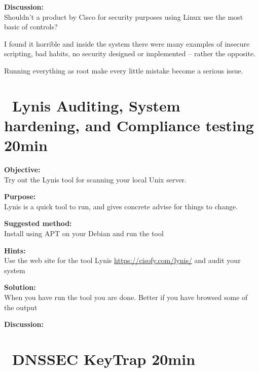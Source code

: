 \documentclass[a4paper,11pt,notitlepage]{report}
\begin{document}
{\bf Discussion:}\\
Shouldn't a product by Cisco for security purposes using Linux use the most basic of controls?

I found it horrible and inside the system there were many examples of insecure scripting, bad habits, no security designed or implemented -- rather the opposite.

Running everything as root make every little mistake become a serious issue.

\chapter{\faExclamationTriangle\ Lynis Auditing, System hardening, and Compliance testing 20min}
\label{ex:lynis-first}


{\bf Objective:}\\
Try out the Lynis tool for scanning your local Unix server.

{\bf Purpose:}\\
Lynis is a quick tool to run, and gives concrete advise for things to change.

{\bf Suggested method:}\\
Install using APT on your Debian and run the tool



{\bf Hints:}\\
Use the web site for the tool Lynis \url{https://cisofy.com/lynis/} and audit your system

{\bf Solution:}\\
When you have run the tool you are done. Better if you have browsed some of the output

{\bf Discussion:}\\


\chapter{\faExclamationTriangle\ DNSSEC KeyTrap 20min}
\label{ex:dnssec-keytrap}

\end{document}
